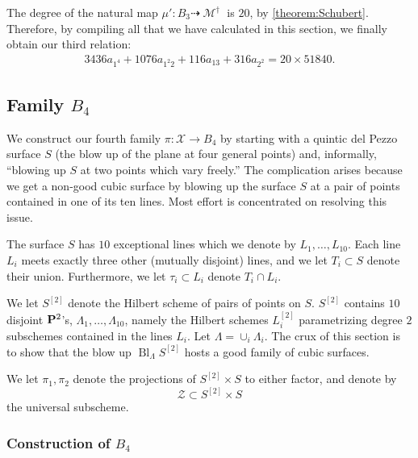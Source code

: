 \documentclass[12pt,reqno]{amsart}
\DeclareMathOperator{\Bl}{Bl}
\DeclareMathOperator{\M}{\mathcal{M}}
\renewcommand{\to}{{\longrightarrow}}
\numberwithin{equation}{section}
\newcommand{\cX}{\mathcal{X}}
\begin{document}
The degree of the natural map
$\mu': B_{3} \dashrightarrow \M^{\dagger}$ is $20$, by
\autoref{theorem:Schubert}. Therefore, by compiling all that we have
calculated in this section, we finally obtain our third relation:
\begin{align}
  \label{eq:relation3}
  3436a_{1^4} + 1076a_{1^{2}2} + 116 a_{13} + 316 a_{2^{2}} = 20 \times 51840.
\end{align}







\subsection{Family $B_4$}




\label{sec:family-b_4}

We construct our fourth family $\pi: \cX \to B_4$ by starting with a
quintic del Pezzo surface $S$ (the blow up of the plane at four
general points) and, informally, ``blowing up $S$ at two points which
vary freely.''  The complication arises because we get a non-good
cubic surface by blowing up the surface $S$ at a pair of points
contained in one of its ten lines.  Most effort is concentrated on
resolving this issue.

The surface $S$ has $10$ exceptional lines which we denote by
$L_{1}, \dots, L_{10}$.  Each line $L_{i}$ meets exactly three other
(mutually disjoint) lines, and we let $T_{i} \subset S$ denote their
union. Furthermore, we let $\tau_{i} \subset L_{i}$ denote
$T_{i} \cap L_{i}$.

We let $S^{[2]}$ denote the Hilbert scheme of
pairs of points on $S$.  $S^{[2]}$ contains $10$ disjoint $\P^{2}$'s,
$\Lambda_1, \dots, \Lambda_{10}$, namely the Hilbert schemes
$L_{i}^{[2]}$ parametrizing degree $2$ subschemes contained in the
lines $L_{i}$. Let $\Lambda = \cup_{i}\Lambda_{i}$.  The crux of this
section is to show that the blow up $\Bl_{\Lambda}S^{[2]}$ hosts a
good family of cubic surfaces.


We let $\pi_{1}, \pi_{2}$ denote the projections of $S^{[2]} \times S$
to either factor, and denote by
$$\mathcal{Z} \subset S^{[2]} \times S$$ the universal subscheme. 

\subsubsection{Construction of $B_4$}
\label{sec:construction-b_4}
\end{document}
